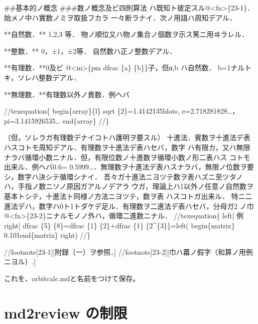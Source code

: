 \begin{reviewemlist}

\#\#基本的ノ概念
\#\#\#数ノ概念及ビ四則算法
ハ既知ト彼定スル@\textless{}fn\textgreater{}\{23{-}1\}．始メノ中ハ實数ノミヲ取扱フカラ
一々断ラナイ．次ノ用語ハ周知デアル．

**自然数．** 1,2,3 等． 物ノ順位又ハ物ノ集合ノ個数ヲ示ス篤ニ用ヰラレル．

**整数．** 0，±1，±2等． 自然数ハ正ノ整数デアル．

**有理数．**0及ビ @\textless{}m\textgreater{}\{\reviewbackslash{}pm \reviewbackslash{}dfrac \{a\reviewbackslash{}\reviewbackslash{}\} \{b\reviewbackslash{}\reviewbackslash{}\}\}子，但α,b ハ自然数． b=1ナルトキ，ソレハ整数デアル．

**無理数．**有理数以外ノ責数．例ヘバ

//texequation\{
\reviewbackslash{}begin\{array\}\{l\}
\reviewbackslash{}sqrt \{2\}=1.4142135\reviewbackslash{}ldots,\reviewbackslash{}\reviewbackslash{}\reviewbackslash{}
e=2.718281828…，\reviewbackslash{}\reviewbackslash{}\reviewbackslash{}
pi=3.1415926535…
\reviewbackslash{}end\{array\}
//\}



（但，ソレラガ有理数デナイコトハ護明ヲ要スル）
  十進法．賓数ヲ十進法デ表ハスコトモ周知デアル．有理数ヲ十進法デ表ハセバ，数字
ハ有限カ，又ハ無限ナラバ循環小数ニナル．但，有限位数ノ十進数ヲ循環小数ノ形二表ハス
コトモ出来ル．例ヘバ0.6= 0.5999…．無理数ヲ十進法デ表ハスナラバ，無限ノ位数ヲ要
シ，数字ハ決シテ循環シナイ．
  吾々ガ十進法ニヨツテ数ヲ表ハズニ至ツタノハ，手指ノ数ニソノ原因ガアルノデアラ
ウガ，理論上ハ1以外ノ任意ノ自然数ヲ基本トシテ，十進法ト同様ノ方法ニヨツテ，数ヲ表
ハスコトガ出来ル．
  特ニ二進法デハ，数字ハ0ト1トダケデ足ル．有理数ヲ二進法デ表ハセバ，分母ガ2
ノ巾@\textless{}fn\textgreater{}\{23{-}2\}ニナルモノノ外ハ，循環二進数ニナル．
//texequation\{
\reviewbackslash{}left[ 例\reviewbackslash{}right] \reviewbackslash{}dfrac \{5\} \{8\}=\reviewbackslash{}dfrac \{1\} \{2\}+\reviewbackslash{}dfrac \{1\} \{2\textasciicircum{}\{3\}\}=\reviewbackslash{}left( \reviewbackslash{}begin\{matrix\} 0.101\reviewbackslash{}end\{matrix\} \reviewbackslash{}right)
//\}

//footnote[23{-}1][附録（一）ヲ参照．]
//footnote[23{-}2][巾ハ羃ノ假字（和算ノ用例ニヨル）.]

\end{reviewemlist}

これを、orbitcalc.mdと名前をつけて保存。

\section{md2review の制限}
\label{sec:4-3}

